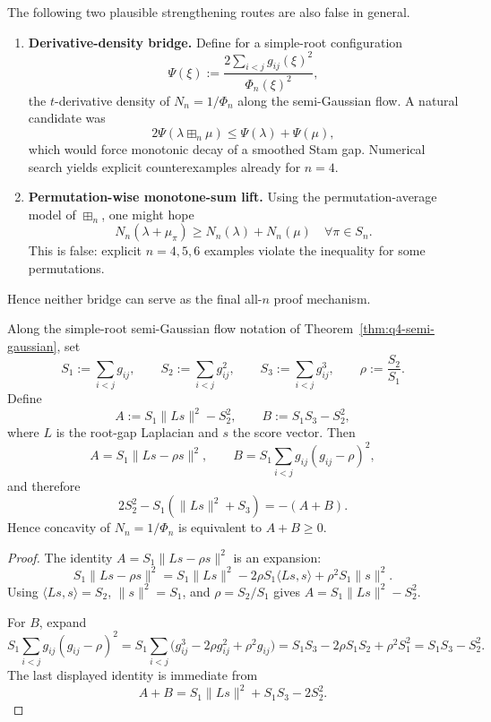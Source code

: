 \begin{remark}
The following two plausible strengthening routes are also false in general.
\begin{enumerate}[nosep]
\item \textbf{Derivative-density bridge.}
Define for a simple-root configuration
\[
\Psi(\xi):=\frac{2\sum_{i<j} g_{ij}(\xi)^2}{\Phi_n(\xi)^2},
\]
the $t$-derivative density of $N_n=1/\Phi_n$ along the semi-Gaussian flow.
A natural candidate was
\[
2\Psi(\lambda\boxplus_n\mu)\le \Psi(\lambda)+\Psi(\mu),
\]
which would force monotonic decay of a smoothed Stam gap.
Numerical search yields explicit counterexamples already for $n=4$.
\item \textbf{Permutation-wise monotone-sum lift.}
Using the permutation-average model of $\boxplus_n$, one might hope
\[
N_n(\lambda+\mu_\pi)\ge N_n(\lambda)+N_n(\mu)\quad\forall \pi\in S_n.
\]
This is false: explicit $n=4,5,6$ examples violate the inequality for some permutations.
\end{enumerate}
Hence neither bridge can serve as the final all-$n$ proof mechanism.
\end{remark}

\begin{lemma}\label{lem:q4-defect-split}
Along the simple-root semi-Gaussian flow notation
of Theorem~\ref{thm:q4-semi-gaussian}, set
\[
S_1:=\sum_{i<j} g_{ij},\qquad
S_2:=\sum_{i<j} g_{ij}^2,\qquad
S_3:=\sum_{i<j} g_{ij}^3,\qquad
\rho:=\frac{S_2}{S_1}.
\]
Define
\[
A:=S_1\|Ls\|^2-S_2^2,\qquad
B:=S_1S_3-S_2^2,
\]
where $L$ is the root-gap Laplacian and $s$ the score vector.
Then
\[
A=S_1\|Ls-\rho s\|^2,\qquad
B=S_1\sum_{i<j} g_{ij}(g_{ij}-\rho)^2,
\]
and therefore
\[
2S_2^2-S_1(\|Ls\|^2+S_3)=-(A+B).
\]
Hence concavity of $N_n=1/\Phi_n$ is equivalent to $A+B\ge 0$.
\end{lemma}

\begin{proof}
The identity $A=S_1\|Ls-\rho s\|^2$ is an expansion:
\[
S_1\|Ls-\rho s\|^2
=S_1\|Ls\|^2-2\rho S_1\langle Ls,s\rangle+\rho^2S_1\|s\|^2.
\]
Using $\langle Ls,s\rangle=S_2$, $\|s\|^2=S_1$, and $\rho=S_2/S_1$ gives
$A=S_1\|Ls\|^2-S_2^2$.

For $B$, expand
\[
S_1\sum_{i<j} g_{ij}(g_{ij}-\rho)^2
=S_1\sum_{i<j}\bigl(g_{ij}^3-2\rho g_{ij}^2+\rho^2 g_{ij}\bigr)
=S_1S_3-2\rho S_1S_2+\rho^2S_1^2
=S_1S_3-S_2^2.
\]
The last displayed identity is immediate from
\[
A+B
=S_1\|Ls\|^2+S_1S_3-2S_2^2.
\]
\end{proof}

